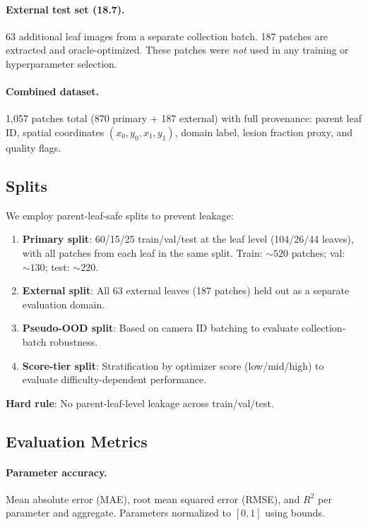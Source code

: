 \documentclass[11pt,a4paper]{article}
\begin{document}
\paragraph{External test set (18.7).}
63 additional leaf images from a separate collection batch.
187 patches are extracted and oracle-optimized.
These patches were \emph{not} used in any training or hyperparameter selection.

\paragraph{Combined dataset.}
1{,}057 patches total (870 primary + 187 external) with full provenance:
parent leaf ID, spatial coordinates $(x_0, y_0, x_1, y_1)$, domain label,
lesion fraction proxy, and quality flags.

\subsection{Splits}

We employ parent-leaf-safe splits to prevent leakage:

\begin{enumerate}[leftmargin=*,itemsep=2pt,label=(\Alph*)]
\item \textbf{Primary split}: 60/15/25 train/val/test at the leaf level
  (104/26/44 leaves), with all patches from each leaf in the same split.
  Train: ${\sim}520$ patches; val: ${\sim}130$; test: ${\sim}220$.

\item \textbf{External split}: All 63 external leaves (187 patches)
  held out as a separate evaluation domain.

\item \textbf{Pseudo-OOD split}: Based on camera ID batching
  to evaluate collection-batch robustness.

\item \textbf{Score-tier split}: Stratification by optimizer score
  (low/mid/high) to evaluate difficulty-dependent performance.
\end{enumerate}

\textbf{Hard rule}: No parent-leaf-level leakage across train/val/test.

\subsection{Evaluation Metrics}

\paragraph{Parameter accuracy.}
Mean absolute error (MAE), root mean squared error (RMSE), and $R^2$
per parameter and aggregate. Parameters normalized to $[0,1]$ using bounds.
\end{document}
